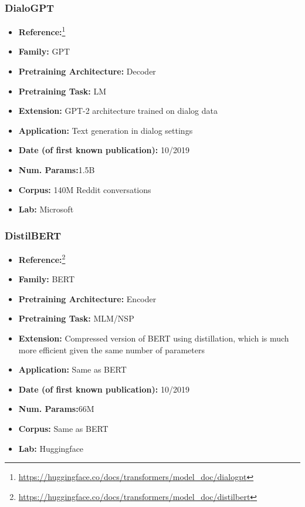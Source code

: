 \documentclass{article}
\begin{document}
\subsubsection{DialoGPT}
            \begin{itemize}
                \item \textbf{Reference:}\footnote{\url{https://huggingface.co/docs/transformers/model_doc/dialogpt}}\cite{zhang2019dialogpt}
                \item \textbf{Family:} GPT 
                \item \textbf{Pretraining Architecture:} Decoder
                \item \textbf{Pretraining Task:} LM
                \item \textbf{Extension:} GPT-2 architecture trained on dialog data  
                \item \textbf{Application:} Text generation in dialog settings
                \item \textbf{Date (of first known publication):} 10/2019
                \item \textbf{Num. Params:}1.5B
                \item \textbf{Corpus:} 140M Reddit conversations
                \item \textbf{Lab:} Microsoft
            \end{itemize}
            
\subsubsection{DistilBERT}
            \begin{itemize}
                \item \textbf{Reference:}\footnote{\url{https://huggingface.co/docs/transformers/model_doc/distilbert}}\cite{sanh2019distilbert}
                \item \textbf{Family:} BERT 
                \item \textbf{Pretraining Architecture:} Encoder
                \item \textbf{Pretraining Task:} MLM/NSP
                \item \textbf{Extension:} Compressed version of BERT using distillation, which is much more efficient given the same number of parameters  
                \item \textbf{Application:} Same as BERT
                \item \textbf{Date (of first known publication):} 10/2019
                \item \textbf{Num. Params:}66M
                \item \textbf{Corpus:} Same as BERT
                \item \textbf{Lab:} Huggingface
            \end{itemize}
            
\end{document}
